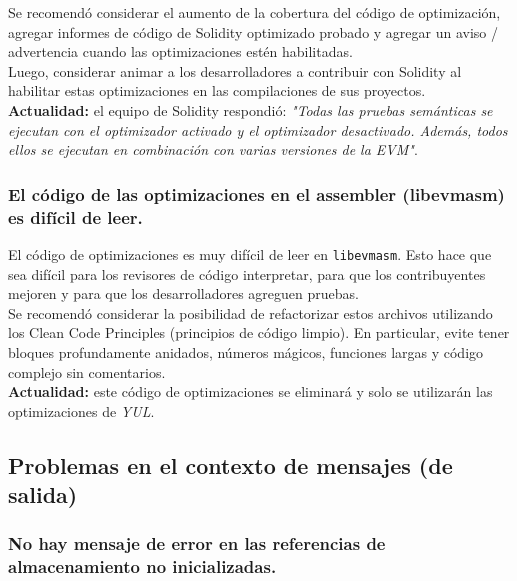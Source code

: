 Se recomendó considerar el aumento de la cobertura del código de optimización, agregar informes de código de Solidity optimizado probado y agregar un aviso / advertencia cuando las optimizaciones estén habilitadas.\\

Luego, considerar animar a los desarrolladores a contribuir con Solidity al habilitar estas optimizaciones en las compilaciones de sus proyectos.\\

\textbf{Actualidad:} el equipo de Solidity respondió: \textit{"Todas las pruebas semánticas se ejecutan con el optimizador activado y el optimizador desactivado. Además, todos ellos se ejecutan en combinación con varias versiones de la EVM"}.\\

\subsubsection{El código de las optimizaciones en el assembler (libevmasm) es difícil de leer.}

El código de optimizaciones\cite{GHlibevmasmCSE} es muy difícil de leer en \texttt{libevmasm}. Esto hace que sea difícil para los revisores de código interpretar, para que los contribuyentes mejoren y para que los desarrolladores agreguen pruebas.\\

Se recomendó considerar la posibilidad de refactorizar estos archivos utilizando los Clean Code Principles\cite{MediumMindorksCleanCode} (principios de código limpio). En particular, evite tener bloques profundamente anidados, números mágicos, funciones largas y código complejo sin comentarios.\\

\textbf{Actualidad:} este código de optimizaciones se eliminará y solo se utilizarán las optimizaciones de \textit{YUL}.\\

\subsection{Problemas en el contexto de mensajes (de salida)}

\subsubsection{No hay mensaje de error en las referencias de almacenamiento no inicializadas.}

